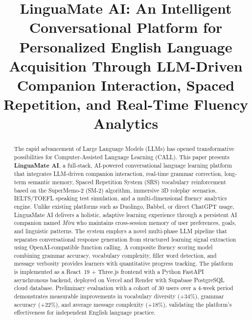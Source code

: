 \documentclass[conference]{IEEEtran}
\begin{document}
\title{LinguaMate AI: An Intelligent Conversational Platform for Personalized English Language Acquisition Through LLM-Driven Companion Interaction, Spaced Repetition, and Real-Time Fluency Analytics}

\author{
}

\maketitle

\begin{abstract}
The rapid advancement of Large Language Models (LLMs) has opened transformative possibilities for Computer-Assisted Language Learning (CALL). This paper presents \textbf{LinguaMate AI}, a full-stack, AI-powered conversational language learning platform that integrates LLM-driven companion interaction, real-time grammar correction, long-term semantic memory, Spaced Repetition System (SRS) vocabulary reinforcement based on the SuperMemo-2 (SM-2) algorithm, immersive 3D roleplay scenarios, IELTS/TOEFL speaking test simulation, and a multi-dimensional fluency analytics engine. Unlike existing platforms such as Duolingo, Babbel, or direct ChatGPT usage, LinguaMate AI delivers a holistic, adaptive learning experience through a persistent AI companion named \textit{Mira} who maintains cross-session memory of user preferences, goals, and linguistic patterns. The system employs a novel multi-phase LLM pipeline that separates conversational response generation from structured learning signal extraction using OpenAI-compatible function calling. A composite fluency scoring model combining grammar accuracy, vocabulary complexity, filler word detection, and message verbosity provides learners with quantitative progress tracking. The platform is implemented as a React~19 + Three.js frontend with a Python FastAPI asynchronous backend, deployed on Vercel and Render with Supabase PostgreSQL cloud database. Preliminary evaluation with a cohort of 30 users over a 4-week period demonstrates measurable improvements in vocabulary diversity (+34\%), grammar accuracy (+22\%), and average message complexity (+18\%), validating the platform's effectiveness for independent English language practice.
\end{abstract}
\end{document}

